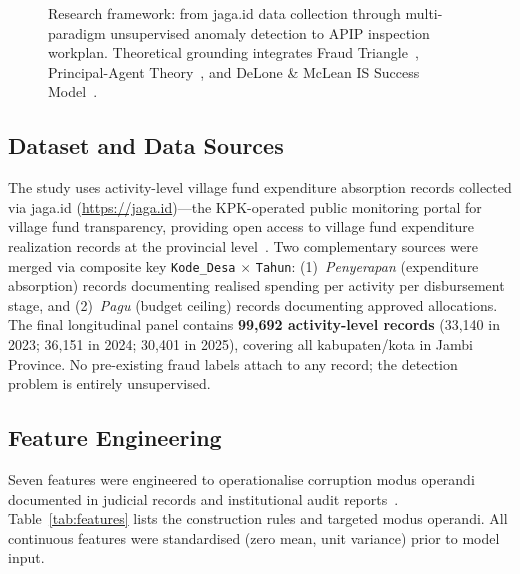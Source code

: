 \documentclass[3p,times,procedia]{elsarticle}
\begin{document}
\begin{figure}[htb]
{}
\caption{Research framework: from jaga.id data collection through multi-paradigm unsupervised anomaly detection to APIP inspection workplan. Theoretical grounding integrates Fraud Triangle~\cite{ref17}, Principal-Agent Theory~\cite{ref26}, and DeLone \& McLean IS Success Model~\cite{ref10}.}
\label{fig:framework}
\end{figure}

\subsection{Dataset and Data Sources}

The study uses activity-level village fund expenditure absorption records collected via jaga.id (\url{https://jaga.id})---the KPK-operated public monitoring portal for village fund transparency, providing open access to village fund expenditure realization records at the provincial level~\cite{ref27}. Two complementary sources were merged via composite key \texttt{Kode\_Desa} $\times$ \texttt{Tahun}: (1)~\textit{Penyerapan} (expenditure absorption) records documenting realised spending per activity per disbursement stage, and (2)~\textit{Pagu} (budget ceiling) records documenting approved allocations. The final longitudinal panel contains \textbf{99,692 activity-level records} (33,140 in 2023; 36,151 in 2024; 30,401 in 2025), covering all kabupaten/kota in Jambi Province. No pre-existing fraud labels attach to any record; the detection problem is entirely unsupervised.

\subsection{Feature Engineering}
\label{sec:features}

Seven features were engineered to operationalise corruption modus operandi documented in judicial records and institutional audit reports~\cite{ref13,ref14}. Table~\ref{tab:features} lists the construction rules and targeted modus operandi. All continuous features were standardised (zero mean, unit variance) prior to model input.
\end{document}
